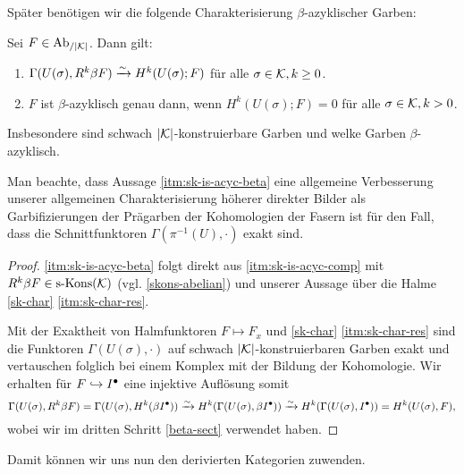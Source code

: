 Später benötigen wir die folgende Charakterisierung
$\beta$-azyklischer Garben:

\begin{prop}[\cite{KS}, 8.1.8] \label{sk-is-acyc}
  Sei $F \in \operatorname{Ab}_{/|\mathcal{K}|}$. Dann gilt:
  \begin{enumerate}[label=(\roman*)]
  \item \label{itm:sk-is-acyc-comp} $\Gamma(U(\sigma), R^k\beta F)
    \xrightarrow[]{\sim} H^k(U(\sigma); F)$ für alle $\sigma \in \mathcal{K}, k \geq 0$.
  \item \label{itm:sk-is-acyc-beta} $F$ ist $\beta$-azyklisch genau dann,
    wenn $H^k(U(\sigma); F) = 0$ für alle $\sigma \in \mathcal{K}, k > 0$.
  \end{enumerate}
  Insbesondere sind schwach $|\mathcal{K}|$-konstruierbare Garben und welke
  Garben $\beta$-azyklisch.
\end{prop}
\begin{bem}
  Man beachte, dass Aussage \ref{itm:sk-is-acyc-beta} eine allgemeine
  Verbesserung unserer allgemeinen Charakterisierung höherer direkter
  Bilder als Garbifizierungen der Prägarben der Kohomologien der
  Fasern ist für den Fall, dass die Schnittfunktoren
  $\Gamma(\pi^{-1}(U), \cdot)$ exakt sind.
\end{bem}
\begin{proof}
  \ref{itm:sk-is-acyc-beta} folgt direkt aus \ref{itm:sk-is-acyc-comp} mit
  $R^k\beta F \in \operatorname{s-Kons}(\mathcal{K})$ (vgl. \ref{skons-abelian}) und unserer
  Aussage über die Halme \ref{sk-char} \ref{itm:sk-char-res}.
  
  Mit der Exaktheit von Halmfunktoren $F \mapsto F_x$ und
  \ref{sk-char} \ref{itm:sk-char-res} sind die Funktoren
  $\Gamma(U(\sigma), \cdot)$ auf schwach $|\mathcal{K}|$-konstruierbaren Garben
  exakt und vertauschen folglich bei einem Komplex mit der Bildung der
  Kohomologie. Wir erhalten für $F \hookrightarrow I^{\bullet}$ eine injektive Auflösung
  somit
  \[ \Gamma(U(\sigma), R^k\beta F)
  = \Gamma(U(\sigma), H^k(\beta I^{\bullet}))
  \xrightarrow[]{\sim} H^k(\Gamma(U(\sigma), \beta I^{\bullet}))
  \xrightarrow[]{\sim} H^k(\Gamma(U(\sigma), I^{\bullet}))
  = H^k(U(\sigma), F), \]
  wobei wir im dritten Schritt \ref{beta-sect} verwendet haben.
\end{proof}

Damit können wir uns nun den derivierten Kategorien zuwenden.

